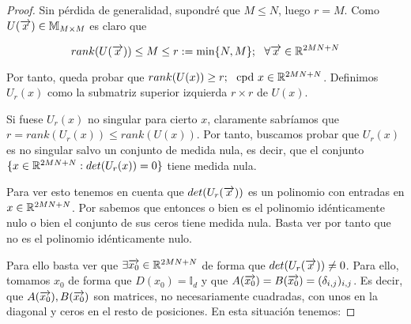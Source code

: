 \begin{proof}
    Sin pérdida de generalidad, supondré que $M \leq N$, luego $r = M$. Como $U(\overrightarrow{x}) \in \mathbb{M}_{M \times M}$ es claro que

    \begin{equation}
        rank(U(\overrightarrow{x})) \leq M \leq r := \min \{N, M \}; \ \  \forall \overrightarrow{x} \in \mathbb{R}^{2MN + N}
    \end{equation}

    Por tanto, queda probar que $rank(U(x)) \geq r; \ \  \text{cpd } x \in \mathbb{R}^{2MN + N}$. Definimos $U_r(x)$ como la submatriz superior izquierda $r \times r$ de $U(x)$.

    Si fuese $U_r(x)$ no singular para cierto $x$, claramente sabríamos que $r = rank(U_r(x)) \leq rank(U(x))$. Por tanto, buscamos probar que $U_r(x)$ es no singular salvo un conjunto de medida nula, es decir, que el conjunto $\{ x \in \mathbb{R}^{2MN + N} : det(U_r(x)) = 0  \}$ tiene medida nula.

    Para ver esto tenemos en cuenta que $det(U_r(\overrightarrow{x}))$ es un polinomio con entradas en $x \in \mathbb{R}^{2MN + N}$. Por  sabemos que entonces o bien es el polinomio idénticamente nulo o bien el conjunto de sus ceros tiene medida nula. Basta ver por tanto que no es el polinomio idénticamente nulo.

    Para ello basta ver que $\exists \overrightarrow{x_0} \in \mathbb{R}^{2MN + N}$ de forma que $det(U_r(\overrightarrow{x})) \neq 0$. Para ello, tomamos $x_0$ de forma que $D(x_0) = \mathbb{I}_d$ y que $A(\overrightarrow{x_0}) = B(\overrightarrow{x_0}) = (\delta_{i,j})_{i,j}$. Es decir, que $A(\overrightarrow{x_0}), B(\overrightarrow{x_0})$ son matrices, no necesariamente cuadradas, con unos en la diagonal y ceros en el resto de posiciones. En esta situación tenemos:


\end{proof}
